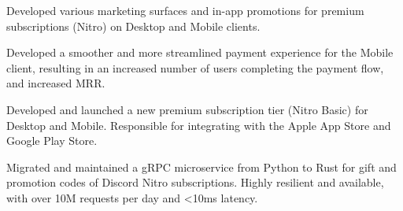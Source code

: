 \documentclass[letterpaper]{deedy-resume-openfont} %
\begin{document}
\begin{tightemize}
\item Developed various marketing surfaces and in-app promotions for premium subscriptions (Nitro) on Desktop and Mobile clients.
\item Developed a smoother and more streamlined payment experience for the Mobile client, resulting in an increased number of users completing the payment flow, and increased MRR.
\item Developed and launched a new premium subscription tier (Nitro Basic) for Desktop and Mobile. Responsible for integrating with the Apple App Store and Google Play Store. 
\item Migrated and maintained a gRPC microservice from Python to Rust for gift and promotion codes of Discord Nitro subscriptions. Highly resilient and available, with over 10M requests per day and <10ms latency.
\end{tightemize}

\sectionsep %

\end{document}
